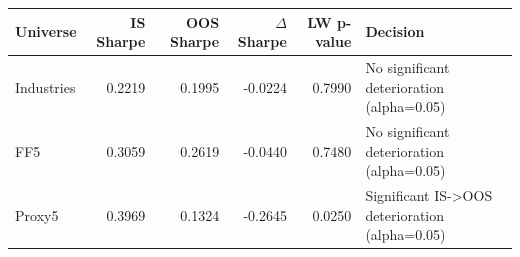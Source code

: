 \begin{tabular}{lrrrrl}
\toprule
Universe & IS Sharpe & OOS Sharpe & $\Delta$ Sharpe & LW p-value & Decision \\
\midrule
Industries & 0.2219 & 0.1995 & -0.0224 & 0.7990 & No significant deterioration (alpha=0.05) \\
FF5 & 0.3059 & 0.2619 & -0.0440 & 0.7480 & No significant deterioration (alpha=0.05) \\
Proxy5 & 0.3969 & 0.1324 & -0.2645 & 0.0250 & Significant IS->OOS deterioration (alpha=0.05) \\
\bottomrule
\end{tabular}
